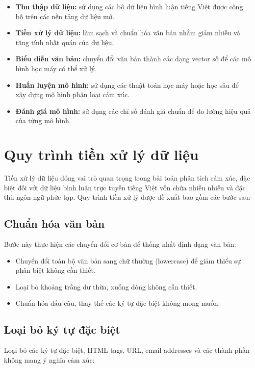 \documentclass[14pt, a4paper]{report}
\begin{document}
\begin{itemize}
    \item \textbf{Thu thập dữ liệu:} sử dụng các bộ dữ liệu bình luận tiếng Việt được công bố trên các nền tảng dữ liệu mở.
    \item \textbf{Tiền xử lý dữ liệu:} làm sạch và chuẩn hóa văn bản nhằm giảm nhiễu và tăng tính nhất quán của dữ liệu.
    \item \textbf{Biểu diễn văn bản:} chuyển đổi văn bản thành các dạng vector số để các mô hình học máy có thể xử lý.
    \item \textbf{Huấn luyện mô hình:} sử dụng các thuật toán học máy hoặc học sâu để xây dựng mô hình phân loại cảm xúc.
    \item \textbf{Đánh giá mô hình:} sử dụng các chỉ số đánh giá chuẩn để đo lường hiệu quả của từng mô hình.
\end{itemize}

\section{Quy trình tiền xử lý dữ liệu}

Tiền xử lý dữ liệu đóng vai trò quan trọng trong bài toán phân tích cảm xúc, đặc biệt đối với dữ liệu bình luận trực tuyến tiếng Việt vốn chứa nhiều nhiễu và đặc thù ngôn ngữ phức tạp. Quy trình tiền xử lý được đề xuất bao gồm các bước sau:

\subsection{Chuẩn hóa văn bản}

Bước này thực hiện các chuyển đổi cơ bản để thống nhất định dạng văn bản:

\begin{itemize}
    \item Chuyển đổi toàn bộ văn bản sang chữ thường (lowercase) để giảm thiểu sự phân biệt không cần thiết.
    \item Loại bỏ khoảng trắng dư thừa, xuống dòng không cần thiết.
    \item Chuẩn hóa dấu câu, thay thế các ký tự đặc biệt không mong muốn.
\end{itemize}

\subsection{Loại bỏ ký tự đặc biệt}

Loại bỏ các ký tự đặc biệt, HTML tags, URL, email addresses và các thành phần không mang ý nghĩa cảm xúc:
\end{document}
